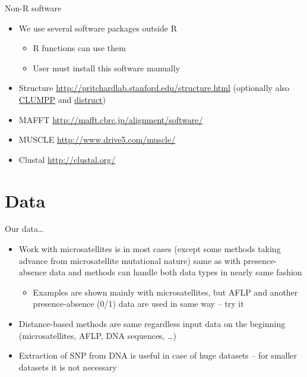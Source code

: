 \documentclass[compress, ucs, xelatex, 11pt, xcolor=svgnames,
  hyperref={
    bookmarks=true,
    unicode=true,
    colorlinks=true,
    pdftitle={Molecular data in R},
    plainpages=false,
    pdfauthor={Vojtech Zeisek},
    pdfsubject={Course about phylogeny and evolution in R},
    pdfcreator={XeLaTeX},
    pdfkeywords={R, evolution, phylogeny, molecular data},
    linkcolor=Tomato,
    anchorcolor=SaddleBrown,
    citecolor=Goldenrod,
    filecolor=DarkMagenta,
    menucolor=Sienna,
    urlcolor=DarkTurquoise,
    pdftex},
  url={hyphens, lowtilde} %
  ]{beamer}
\begin{document}
\begin{frame}{Non-R software}
  \begin{itemize}
    \item We use several software packages outside R
    \begin{itemize}
      \item R functions can use them
      \item User must install this software manually
    \end{itemize}
    \item Structure \url{http://pritchardlab.stanford.edu/structure.html} (optionally also \href{https://web.stanford.edu/group/rosenberglab/clumpp.html}{CLUMPP} and \href{https://web.stanford.edu/group/rosenberglab/distruct.html}{distruct})
    \item MAFFT \url{http://mafft.cbrc.jp/alignment/software/}
    \item MUSCLE \url{http://www.drive5.com/muscle/}
    \item Clustal \url{http://clustal.org/}
  \end{itemize}
\end{frame}

\section{Data}

\begin{frame}{Our data\ldots}
  \begin{itemize}
    \item Work with microsatellites is in most cases (except some methods taking advance from microsatellite mutational nature) same as with presence-absence data and methods can handle both data types in nearly same fashion
    \begin{itemize}
      \item Examples are shown mainly with microsatellites, but AFLP and another presence-absence (0/1) data are used in same way -- try it
    \end{itemize}
    \item Distance-based methods are same regardless input data on the beginning (microsatellites, AFLP, DNA sequences, \ldots)
    \item Extraction of SNP from DNA is useful in case of huge datasets -- for smaller datasets it is not necessary
  \end{itemize}
\end{frame}
\end{document}
